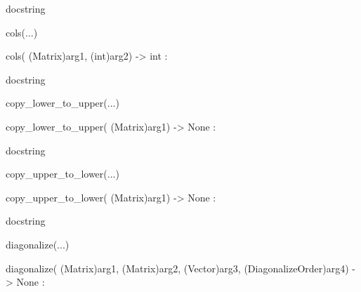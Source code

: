 \documentclass[letterpaper,10pt,english]{sphinxmanual}
\begin{document}
\begin{description}
\begin{description}
\begin{DUlineblock}{0em}
\begin{DUlineblock}{\DUlineblockindent}
\item[]
\begin{DUlineblock}{\DUlineblockindent}
\item[] docstring
\item[] 
\end{DUlineblock}
\end{DUlineblock}
\item[] cols(...)
\item[]
\begin{DUlineblock}{\DUlineblockindent}
\item[] cols( (Matrix)arg1, (int)arg2) -\textgreater{} int :
\item[]
\begin{DUlineblock}{\DUlineblockindent}
\item[] docstring
\item[] 
\end{DUlineblock}
\end{DUlineblock}
\item[] copy\_lower\_to\_upper(...)
\item[]
\begin{DUlineblock}{\DUlineblockindent}
\item[] copy\_lower\_to\_upper( (Matrix)arg1) -\textgreater{} None :
\item[]
\begin{DUlineblock}{\DUlineblockindent}
\item[] docstring
\item[] 
\end{DUlineblock}
\end{DUlineblock}
\item[] copy\_upper\_to\_lower(...)
\item[]
\begin{DUlineblock}{\DUlineblockindent}
\item[] copy\_upper\_to\_lower( (Matrix)arg1) -\textgreater{} None :
\item[]
\begin{DUlineblock}{\DUlineblockindent}
\item[] docstring
\item[] 
\end{DUlineblock}
\end{DUlineblock}
\item[] diagonalize(...)
\item[]
\begin{DUlineblock}{\DUlineblockindent}
\item[] diagonalize( (Matrix)arg1, (Matrix)arg2, (Vector)arg3, (DiagonalizeOrder)arg4) -\textgreater{} None :

\end{DUlineblock}
\end{DUlineblock}
\end{description}
\end{description}
\end{document}
